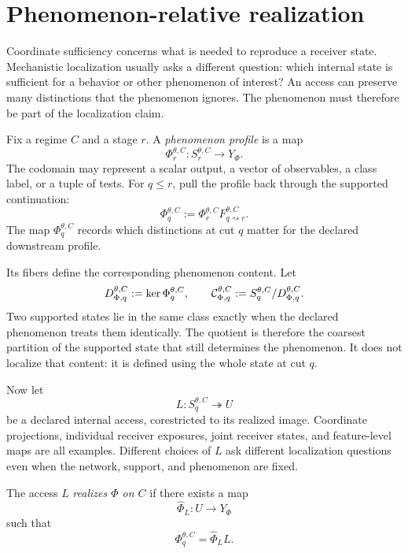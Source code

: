 \section{Phenomenon-relative realization}
\label{sec:phenomenon-realization}

Coordinate sufficiency concerns what is needed to reproduce a receiver state. Mechanistic localization usually asks a different question: which internal state is sufficient for a behavior or other phenomenon of interest? An access can preserve many distinctions that the phenomenon ignores. The phenomenon must therefore be part of the localization claim.

Fix a regime $C$ and a stage $r$. A \emph{phenomenon profile} is a map
\[
\Phi_r^{\theta,C}:S_r^{\theta,C}\to Y_\Phi.
\]
The codomain may represent a scalar output, a vector of observables, a class label, or a tuple of tests. For $q\le r$, pull the profile back through the supported continuation:
\begin{equation}
\Phi_q^{\theta,C}
:=
\Phi_r^{\theta,C}
F_{q\rightsquigarrow r}^{\theta,C}.
\label{eq:phenomenon-pullback}
\end{equation}
The map $\Phi_q^{\theta,C}$ records which distinctions at cut $q$ matter for the declared downstream profile.

Its fibers define the corresponding phenomenon content. Let
\[
D_{\Phi,q}^{\theta,C}:=
\operatorname{ker}\Phi_q^{\theta,C},
\qquad
\mathcal{C}_{\Phi,q}^{\theta,C}
:=S_q^{\theta,C}/D_{\Phi,q}^{\theta,C}.
\]
Two supported states lie in the same class exactly when the declared phenomenon treats them identically. The quotient is therefore the coarsest partition of the supported state that still determines the phenomenon. It does not localize that content: it is defined using the whole state at cut $q$.

Now let
\[
L:S_q^{\theta,C}\twoheadrightarrow U
\]
be a declared internal access, corestricted to its realized image. Coordinate projections, individual receiver exposures, joint receiver states, and feature-level maps are all examples. Different choices of $L$ ask different localization questions even when the network, support, and phenomenon are fixed.

\begin{definition}
The access $L$ \emph{realizes $\Phi$ on $C$} if there exists a map
\[
\widehat\Phi_L:U\to Y_\Phi
\]
such that
\begin{equation}
\Phi_q^{\theta,C}=\widehat\Phi_L L.
\label{eq:realization-definition}
\end{equation}
\end{definition}

